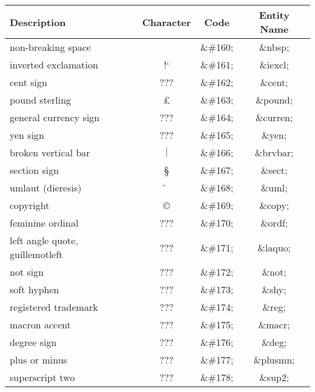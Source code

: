 \begin{table}[htbp]
  \begin{center}
    \leavevmode

    \begin{tabular}{lc>{\ttfamily}c>{\ttfamily}c}
      \textbf{Description} &
      \textbf{Character} &
      \textbf{Code} &
      \textbf{Entity Name} \\
      \hline
      non-breaking space                & \verb*| |  & \&\#160; & \&nbsp; \\
      inverted exclamation              & !`         & \&\#161; & \&iexcl; \\
      cent sign                         & ???        & \&\#162; & \&cent; \\
      pound sterling                    & \pounds    & \&\#163; & \&pound; \\
      \hline
      general currency sign             & ???        & \&\#164; & \&curren; \\
      yen sign                          & ???        & \&\#165; & \&yen; \\
      broken vertical bar               & $\mid$     & \&\#166; & \&brvbar; \\
      section sign                      & \S         & \&\#167; & \&sect; \\
      \hline
      umlaut (dieresis)                 & \"{ }      & \&\#168; & \&uml; \\
      copyright                         & \copyright & \&\#169; & \&copy; \\
      feminine ordinal                  & ???        & \&\#170; & \&ordf; \\
      left angle quote, guillemotleft   & ???        & \&\#171; & \&laquo; \\
      \hline
      not sign                          & ???        & \&\#172; & \&not; \\
      soft hyphen                       & ???        & \&\#173; & \&shy; \\
      registered trademark              & ???        & \&\#174; & \&reg; \\
      macron accent                     & ???        & \&\#175; & \&macr; \\
      \hline
      degree sign                       & ???        & \&\#176; & \&deg; \\
      plus or minus                     & ???        & \&\#177; & \&plusmn; \\
      superscript two                   & ???        & \&\#178; & \&sup2; \\

\end{tabular}
\end{center}
\end{table}
